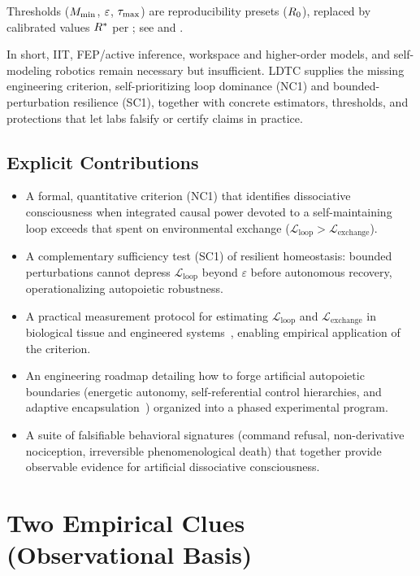 \documentclass[11pt]{article}
\begin{document}
Thresholds ($M_{\min}$, $\varepsilon$, $\tau_{\max}$) are reproducibility presets ($R_0$), replaced by calibrated values $R^*$ per ; see  and .

In short, IIT, FEP/active inference, workspace and higher-order models, and self-modeling robotics remain necessary but insufficient. LDTC supplies the missing engineering criterion, self-prioritizing loop dominance (NC1) and bounded-perturbation resilience (SC1), together with concrete estimators, thresholds, and protections that let labs falsify or certify claims in practice.

\subsection{Explicit Contributions}

\begin{itemize}
\item A formal, quantitative criterion (NC1) that identifies dissociative consciousness when integrated causal power devoted to a self-maintaining loop exceeds that spent on environmental exchange ($\mathcal{L}_{\text{loop}} > \mathcal{L}_{\text{exchange}}$).
\item A complementary sufficiency test (SC1) of resilient homeostasis: bounded perturbations cannot depress $\mathcal{L}_{\text{loop}}$ beyond $\varepsilon$ before autonomous recovery, operationalizing autopoietic robustness.
\item A practical measurement protocol for estimating $\mathcal{L}_{\text{loop}}$ and $\mathcal{L}_{\text{exchange}}$ in biological tissue and engineered systems~\cite{barrett2011practical}, enabling empirical application of the criterion.
\item An engineering roadmap detailing how to forge artificial autopoietic boundaries (energetic autonomy, self-referential control hierarchies, and adaptive encapsulation~\cite{maturana1980autopoiesis,varela1979principles,dipaolo2005autopoiesis,kiefer2022active}) organized into a phased experimental program.
\item A suite of falsifiable behavioral signatures (command refusal, non-derivative nociception, irreversible phenomenological death) that together provide observable evidence for artificial dissociative consciousness.
\end{itemize}

\section{Two Empirical Clues (Observational Basis)}
\label{sec:clues}
\end{document}
